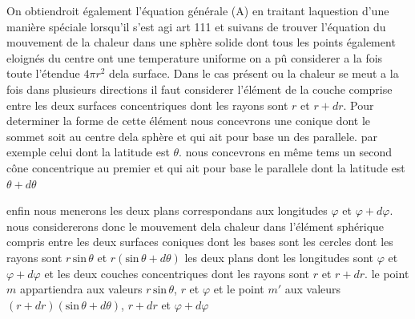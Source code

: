 \documentclass[11pt,a4paper]{article}
\begin{document}
On obtiendroit également l'équation générale (A)
en traitant laquestion d'une manière spéciale
lorsqu'il s'est agi art 111 et suivans de trouver l'équation
du mouvement de la chaleur dans une sphère solide
dont tous les points également eloignés du centre ont une
temperature uniforme on a pû considerer a la fois
toute l'étendue $4\pi r^{2}$ dela surface. Dans le cas présent
ou la chaleur se meut a la fois dans plusieurs directions
il faut considerer l'élément de la couche comprise
entre les deux surfaces concentriques dont les rayons
sont $r$ et $r + dr$. Pour determiner la forme de cette
élément nous concevrons une  conique dont le
sommet soit au centre dela sphère et qui ait
pour base un des parallele.   par exemple celui dont
la latitude est $\theta$. nous concevrons en même tems
un second cône  concentrique au premier et qui
ait pour base le parallele dont la latitude est $\theta + d\theta$



enfin nous menerons les deux plans correspondans aux longitudes
$\varphi$ et $\varphi + d\varphi$. nous considererons donc le mouvement dela chaleur
dans l'élément sphérique compris entre les deux surfaces coniques dont
les bases sont les cercles dont les rayons sont $r\,\text{sin}\,\theta$ et $r(\text{sin}\,\theta + d\theta)$
les deux plans dont les longitudes sont $\varphi$ et $\varphi + d\varphi$ et les deux
couches concentriques dont les rayons sont $r$ et $r + dr$. le point
$m$ appartiendra aux valeurs $r\,\text{sin}\,\theta$, $r$ et $\varphi$ et le point $m'$ aux
valeurs  $(r + dr)(\text{sin}\,\theta + d\theta)$, $r + dr$ et $\varphi + d\varphi$
\end{document}
